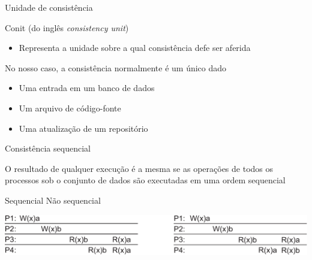 \documentclass[compress]{beamer}
\begin{document}

\begin{frame}{Unidade de consistência}

Conit (do inglês \textit{consistency unit})
\begin{itemize}
    \item Representa a unidade sobre a qual consistência defe ser aferida
\end{itemize}

\vspace{0.5cm}

No nosso caso, a consistência normalmente é um único dado
\begin{itemize}
    \item Uma entrada em um banco de dados
    \item Um arquivo de código-fonte
    \item Uma atualização de um repositório
\end{itemize}
\end{frame}


\begin{frame}{Consistência sequencial}

O resultado de qualquer execução é a mesma se as operações de todos os processos sob o conjunto de dados são executadas em uma ordem sequencial

\vspace{1cm}

\centering 

Sequencial \hspace{4cm} Não sequencial

\vspace{.15cm}

\includegraphics[width=\textwidth]{images/sequencial.png}
\end{frame}

\end{document}
